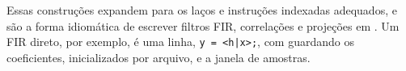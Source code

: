 Essas construções expandem para os laços e instruções indexadas adequados, e são a forma idiomática de escrever filtros FIR, correlações e projeções em \cmm{}. Um FIR direto, por exemplo, é uma linha, \texttt{y = <h|x>;}, com  guardando os coeficientes, inicializados por arquivo, e  a janela de amostras.
